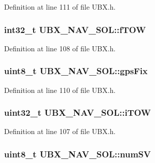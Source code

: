 \-Definition at line 111 of file \-U\-B\-X.\-h.

\hypertarget{struct_u_b_x___n_a_v___s_o_l_a7e73f1e4919dbde57008c9f9fad153cf}{
\subsubsection[{f\-T\-O\-W}]{\setlength{\rightskip}{0pt plus 5cm}int32\-\_\-t {\bf \-U\-B\-X\-\_\-\-N\-A\-V\-\_\-\-S\-O\-L\-::f\-T\-O\-W}}}\label{struct_u_b_x___n_a_v___s_o_l_a7e73f1e4919dbde57008c9f9fad153cf}


\-Definition at line 108 of file \-U\-B\-X.\-h.

\hypertarget{struct_u_b_x___n_a_v___s_o_l_ae821898e9ca043790d8f58da75355f38}{
\subsubsection[{gps\-Fix}]{\setlength{\rightskip}{0pt plus 5cm}uint8\-\_\-t {\bf \-U\-B\-X\-\_\-\-N\-A\-V\-\_\-\-S\-O\-L\-::gps\-Fix}}}\label{struct_u_b_x___n_a_v___s_o_l_ae821898e9ca043790d8f58da75355f38}


\-Definition at line 110 of file \-U\-B\-X.\-h.

\hypertarget{struct_u_b_x___n_a_v___s_o_l_a22a48bcb2972bbd63bf5b5c0a29b8713}{
\subsubsection[{i\-T\-O\-W}]{\setlength{\rightskip}{0pt plus 5cm}uint32\-\_\-t {\bf \-U\-B\-X\-\_\-\-N\-A\-V\-\_\-\-S\-O\-L\-::i\-T\-O\-W}}}\label{struct_u_b_x___n_a_v___s_o_l_a22a48bcb2972bbd63bf5b5c0a29b8713}


\-Definition at line 107 of file \-U\-B\-X.\-h.

\hypertarget{struct_u_b_x___n_a_v___s_o_l_ab171c210f9cc253577d01441b9e1c439}{
\subsubsection[{num\-S\-V}]{\setlength{\rightskip}{0pt plus 5cm}uint8\-\_\-t {\bf \-U\-B\-X\-\_\-\-N\-A\-V\-\_\-\-S\-O\-L\-::num\-S\-V}}}\label{struct_u_b_x___n_a_v___s_o_l_ab171c210f9cc253577d01441b9e1c439}


